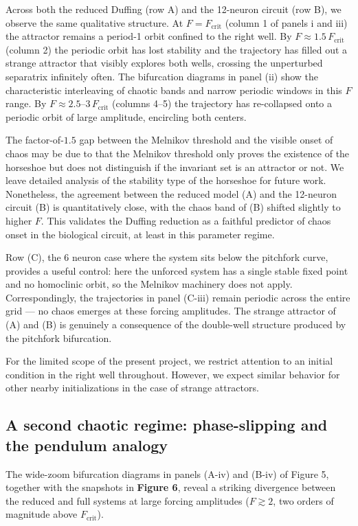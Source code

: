 \documentclass[11pt]{article}
\begin{document}
Across both the reduced Duffing (row A) and the 12-neuron circuit (row B), we observe the same qualitative structure. At $F = F_{\text{crit}}$ (column 1 of panels i and iii) the attractor remains a period-1 orbit confined to the right well. By $F \approx 1.5\,F_{\text{crit}}$ (column 2) the periodic orbit has lost stability and the trajectory has filled out a strange attractor that visibly explores both wells, crossing the unperturbed separatrix infinitely often. The bifurcation diagrams in panel (ii) show the characteristic interleaving of chaotic bands and narrow periodic windows in this $F$ range. By $F \approx 2.5\text{--}3\,F_{\text{crit}}$ (columns 4--5) the trajectory has re-collapsed onto a periodic orbit of large amplitude, encircling both centers.

The factor-of-$1.5$ gap between the Melnikov threshold and the visible onset of chaos may be due to that the Melnikov threshold only proves the existence of the horseshoe but does not distinguish if the invariant set is an attractor or not. We leave detailed analysis of the stability type of the horseshoe for future work. Nonetheless, the agreement between the reduced model (A) and the 12-neuron circuit (B) is quantitatively close, with the chaos band of (B) shifted slightly to higher $F$. This validates the Duffing reduction as a faithful predictor of chaos onset in the biological circuit, at least in this parameter regime.

Row (C), the 6 neuron case where the system sits below the pitchfork curve, provides a useful control: here the unforced system has a single stable fixed point and no homoclinic orbit, so the Melnikov machinery does not apply. Correspondingly, the trajectories in panel (C-iii) remain periodic across the entire grid --- no chaos emerges at these forcing amplitudes. The strange attractor of (A) and (B) is genuinely a consequence of the double-well structure produced by the pitchfork bifurcation.

For the limited scope of the present project, we restrict attention to an initial condition in the right well throughout. However, we expect similar behavior for other nearby initializations in the case of strange attractors.

\subsection{A second chaotic regime: phase-slipping and the pendulum analogy}

The wide-zoom bifurcation diagrams in panels (A-iv) and (B-iv) of Figure 5, together with the snapshots in \textbf{Figure 6}, reveal a striking divergence between the reduced and full systems at large forcing amplitudes ($F \gtrsim 2$, two orders of magnitude above $F_{\text{crit}}$).
\end{document}
